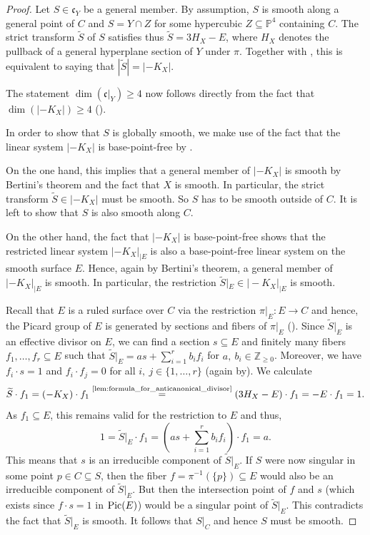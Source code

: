 \documentclass[english,11pt,reqno]{amsart}
\newcommand{\sub}{\subseteq}
\newcommand{\Pfour}{\mathbb{P}^4}
\newcommand{\Z}{\mathbb{Z}}
\newcommand{\Pic}{\textup{Pic}}
\newcommand{\dd}{\mathfrak{c}}
\begin{document}
\begin{proof}
Let $S\in \dd_Y$ be a general member. By assumption, $S$ is smooth along a general point of $C$ and $S=Y\cap Z$ for some hypercubic $Z\sub \Pfour$ containing $C$. The strict transform $\widetilde{S}$ of $S$ satisfies thus $\widetilde{S} = 3H_X - E$, where $H_X$ denotes the pullback of a general hyperplane section of $Y$ under $\pi$. Together with , this is equivalent to saying that $|\widetilde{S}|=|-K_X|$. \par 
The statement $\dim(\dd|_Y)\geq 4$ now follows directly from the fact that $\dim(|-K_X|)\geq 4$ (). \par
In order to show that $S$ is globally smooth, we make use of the fact that the linear system $|-K_X|$ is base-point-free by . \par 
On the one hand, this implies that a general member of $|-K_X|$ is smooth by Bertini's theorem and the fact that $X$ is smooth. In particular, the strict transform $\widetilde{S}\in |-K_X|$ must be smooth. So $S$ has to be smooth outside of $C$. It is left to show that $S$ is also smooth along $C$.\par
On the other hand, the fact that $|-K_X|$ is base-point-free shows that the restricted linear system $|-K_X |_{|E}$ is also a base-point-free linear system on the smooth surface $E$. Hence, again by Bertini's theorem, a general member of $|-K_X |_{|E}$ is smooth. In particular, the restriction $\widetilde{S}|_E\in |-K_X |_{|E}$ is smooth.\par 
Recall that $E$ is a ruled surface over $C$ via the restriction $\pi|_E:E\rightarrow C$ and hence, the Picard group of $E$ is generated by sections and fibers of $\pi|_E$ (\cite[Prop.\ V.2.3]{Hartshorne}). Since $\widetilde{S}|_E$ is an effective divisor on $E$, we can find a section $s\sub E$ and finitely many fibers $f_1,\dots,f_r\sub E$ such that $\widetilde{S}|_E=as+\sum_{i=1}^r b_i f_i$ for $a,\:b_i\in \Z_{\geq0}$. Moreover, we have $f_i\cdot s=1$ and $f_i\cdot f_j=0$ for all $i,\:j\in\{1,\dots,r\}$ (again by\cite[Prop.\ V.2.3]{Hartshorne}). We calculate
$$ \widetilde{S}\cdot f_1 = (-K_X)\cdot f_1 \overset{\textup{\ref{lem:formula_for_anticanonical_divisor}}}{=} (3H_X-E)\cdot f_1 = -E\cdot f_1 = 1.$$
As $f_1\sub E$, this remains valid for the restriction to $E$ and thus,
$$1=\widetilde{S}|_E \cdot f_1= \left(as+\sum_{i=1}^r b_i f_i\right)\cdot f_1=a.$$
This means that $s$ is an irreducible component of $\widetilde{S}|_E$. If $S$ were now singular in some point $p\in C \sub S$, then the fiber $f=\pi^{-1}(\{p\})\sub E$ would also be an irreducible component of $\widetilde{S}|_E$. But then the intersection point of $f$ and $s$ (which exists since $f\cdot s =1$ in $\Pic(E)$) would be a singular point of $\widetilde{S}|_E$. This contradicts the fact that $\widetilde{S}|_E$ is smooth. It follows that $S|_C$ and hence $S$ must be smooth. \par 

\end{proof}
\end{document}
